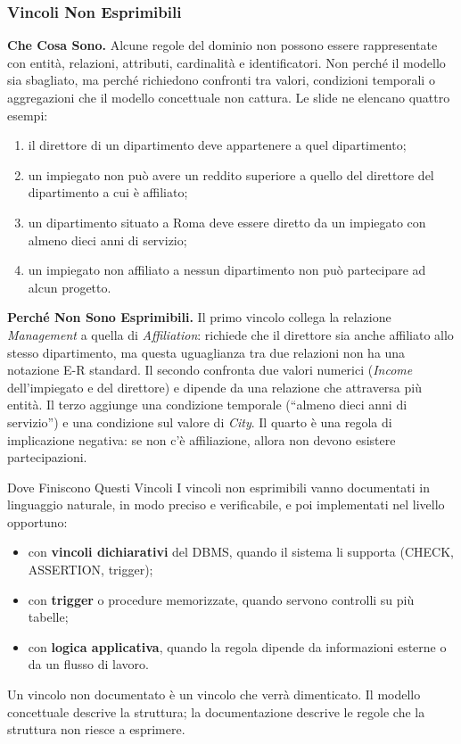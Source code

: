 \documentclass[12pt]{extarticle}
\begin{document}

\subsubsection{Vincoli Non Esprimibili}

\noindent \textbf{Che Cosa Sono.} Alcune regole del dominio non possono essere rappresentate con entità, relazioni, attributi, cardinalità e identificatori. Non perché il modello sia sbagliato, ma perché richiedono confronti tra valori, condizioni temporali o aggregazioni che il modello concettuale non cattura. Le slide ne elencano quattro esempi:
\begin{enumerate}
    \item il direttore di un dipartimento deve appartenere a quel dipartimento;
    \item un impiegato non può avere un reddito superiore a quello del direttore del dipartimento a cui è affiliato;
    \item un dipartimento situato a Roma deve essere diretto da un impiegato con almeno dieci anni di servizio;
    \item un impiegato non affiliato a nessun dipartimento non può partecipare ad alcun progetto.
\end{enumerate}

\medskip
\noindent \textbf{Perché Non Sono Esprimibili.} Il primo vincolo collega la relazione \textit{Management} a quella di \textit{Affiliation}: richiede che il direttore sia anche affiliato allo stesso dipartimento, ma questa uguaglianza tra due relazioni non ha una notazione E-R standard. Il secondo confronta due valori numerici (\textit{Income} dell'impiegato e del direttore) e dipende da una relazione che attraversa più entità. Il terzo aggiunge una condizione temporale (``almeno dieci anni di servizio'') e una condizione sul valore di \textit{City}. Il quarto è una regola di implicazione negativa: se non c'è affiliazione, allora non devono esistere partecipazioni.

\begin{cbox}{Dove Finiscono Questi Vincoli}
\noindent I vincoli non esprimibili vanno documentati in linguaggio naturale, in modo preciso e verificabile, e poi implementati nel livello opportuno:
\begin{itemize}
    \item con \textbf{vincoli dichiarativi} del DBMS, quando il sistema li supporta (CHECK, ASSERTION, trigger);
    \item con \textbf{trigger} o procedure memorizzate, quando servono controlli su più tabelle;
    \item con \textbf{logica applicativa}, quando la regola dipende da informazioni esterne o da un flusso di lavoro.
\end{itemize}
Un vincolo non documentato è un vincolo che verrà dimenticato. Il modello concettuale descrive la struttura; la documentazione descrive le regole che la struttura non riesce a esprimere.
\end{cbox}
\end{document}
